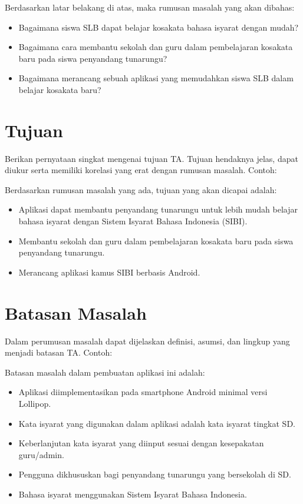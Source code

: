 \documentclass[a4paper,11pt,oneside]{report}
\begin{document}
Berdasarkan latar belakang di atas, maka rumusan masalah yang akan dibahas:
\begin{itemize}
    \item Bagaimana siswa SLB dapat belajar kosakata bahasa isyarat dengan mudah?
    \item Bagaimana cara membantu sekolah dan guru dalam pembelajaran kosakata
    baru pada siswa penyandang tunarungu?
    \item Bagaimana merancang sebuah aplikasi yang memudahkan siswa SLB dalam
    belajar kosakata baru?
\end{itemize}

\section{Tujuan}
Berikan pernyataan singkat mengenai tujuan TA. Tujuan hendaknya jelas, dapat
diukur serta memiliki korelasi yang erat dengan rumusan masalah. Contoh:

Berdasarkan rumusan masalah yang ada, tujuan yang akan dicapai adalah:
\begin{itemize}
    \item Aplikasi dapat membantu penyandang tunarungu untuk lebih mudah belajar
    bahasa isyarat dengan Sistem Isyarat Bahasa Indonesia (SIBI).
    \item Membantu sekolah dan guru dalam pembelajaran kosakata baru pada siswa
    penyandang tunarungu.
    \item Merancang aplikasi kamus SIBI berbasis Android.
\end{itemize}

\section{Batasan Masalah}
Dalam perumusan masalah dapat dijelaskan definisi, asumsi, dan lingkup yang
menjadi batasan TA. Contoh:

Batasan masalah dalam pembuatan aplikasi ini adalah:
\begin{itemize}
    \item Aplikasi diimplementasikan pada smartphone Android minimal versi Lollipop.
    \item Kata isyarat yang digunakan dalam aplikasi adalah kata isyarat tingkat SD.
    \item Keberlanjutan kata isyarat yang diinput sesuai dengan kesepakatan guru/admin.
    \item Pengguna dikhususkan bagi penyandang tunarungu yang bersekolah di SD.
    \item Bahasa isyarat menggunakan Sistem Isyarat Bahasa Indonesia.
\end{itemize}
\end{document}
